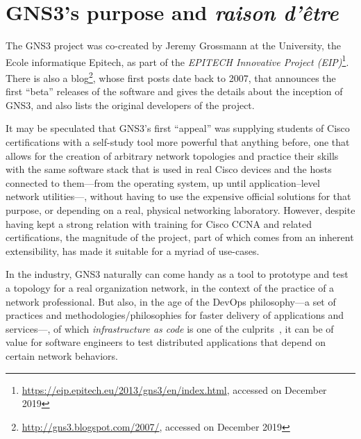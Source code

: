

\section{GNS3's purpose and \emph{raison d'être}}
\label{sec:gns3why}

The GNS3 project was co-created by Jeremy Grossmann at the University, the Ecole informatique Epitech, as part of the \emph{EPITECH Innovative Project (EIP)}\footnote{\url{https://eip.epitech.eu/2013/gns3/en/index.html}, accessed on December 2019}.
There is also a blog\footnote{\url{http://gns3.blogspot.com/2007/}, accessed on December 2019}, whose first posts date back to 2007, that announces the first ``beta'' releases of the software and gives the details about the inception of GNS3, and also lists the original developers of the project.

It may be speculated that GNS3's first ``appeal'' was supplying students of Cisco certifications with a self-study tool more powerful that anything before, one that allows for the creation of arbitrary network topologies and practice their skills with the same software stack that is used in real Cisco devices and the hosts connected to them---from the operating system, up until application--level network utilities---, without having to use the expensive official solutions for that purpose, or depending on a real, physical networking laboratory.
However, despite having kept a strong relation with training for Cisco CCNA and related certifications, the magnitude of the project, part of which comes from an inherent extensibility, has made it suitable for a myriad of use-cases.

In the industry, GNS3 naturally can come handy as a tool to prototype and test a topology for a real organization network, in the context of the practice of a network professional.
But also, in the age of the DevOps philosophy---a set of practices and methodologies/philosophies for faster delivery of applications and services---, of which \emph{infrastructure as code} is one of the culprits~\cite{awswhatisdevops}, it can be of value for software engineers to test distributed applications that depend on certain network behaviors. %


